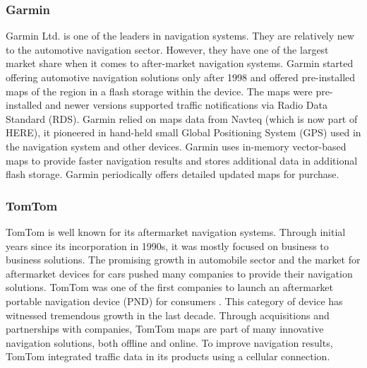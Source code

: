 \subsubsection{Garmin}
Garmin Ltd. is one of the leaders in navigation systems. They are relatively new to the automotive navigation sector. However, they have one of the largest market share when it comes to after-market navigation systems. Garmin started offering automotive navigation solutions only after 1998 and offered pre-installed maps of the region in a flash storage within the device. The maps were pre-installed and newer versions supported traffic notifications via Radio Data Standard (RDS). Garmin relied on maps data from Navteq (which is now part of HERE), it pioneered in hand-held small Global Positioning System (GPS) used in the navigation system and other devices. Garmin uses in-memory vector-based maps to provide faster navigation results and stores additional data in additional flash storage. Garmin periodically offers detailed updated maps for purchase.
\subsubsection{TomTom}
TomTom is well known for its aftermarket navigation systems. Through initial years since its incorporation in 1990s, it was mostly focused on business to business solutions. The promising growth in automobile sector and the market for aftermarket devices for cars pushed many companies to provide their navigation solutions. TomTom was one of the first companies to launch an aftermarket portable navigation device (PND) for consumers \cite{tomtomhistory}. This category of device has witnessed tremendous growth in the last decade. Through acquisitions and partnerships with companies, TomTom maps are part of many innovative navigation solutions, both offline and online. To improve navigation results, TomTom integrated traffic data in its products using a cellular connection. 


